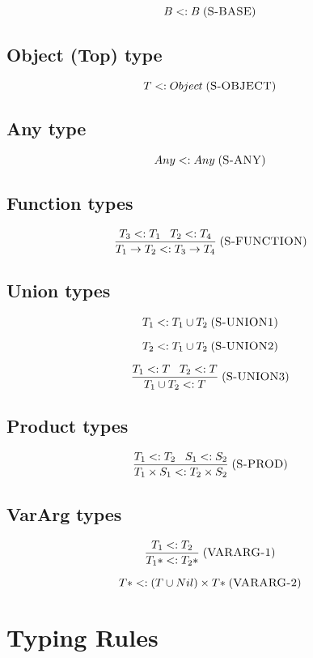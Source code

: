 \documentclass[12pt]{article}
\newcommand{\mylabel}[1]{\; (\textsc{#1})}
\newcommand{\subtype}{<:}
\begin{document}
\[
B \subtype B
\mylabel{S-BASE}
\]

\subsection{Object (Top) type}

\[
T \subtype Object
\mylabel{S-OBJECT}
\]

\subsection{Any type}

\[
Any \subtype Any
\mylabel{S-ANY}
\]

\subsection{Function types}

\[
\frac{T_{3} \subtype T_{1} \;\;\; T_{2} \subtype T_{4}}
     {T_{1} \rightarrow T_{2} \subtype T_{3} \rightarrow T_{4}}
\mylabel{S-FUNCTION}
\]

\subsection{Union types}

\[
T_{1} \subtype T_{1} \cup T_{2}
\mylabel{S-UNION1}
\]

\[
T_{2} \subtype T_{1} \cup T_{2}
\mylabel{S-UNION2}
\]

\[
\frac{T_{1} \subtype T \;\;\; T_{2} \subtype T}
     {T_{1} \cup T_{2} \subtype T}
\mylabel{S-UNION3}
\]

\subsection{Product types}

\[
\frac{T_{1} \subtype T_{2} \;\;\; S_{1} \subtype S_{2}}
     {T_{1} \times S_{1} \subtype T_{2} \times S_{2}}
\mylabel{S-PROD}
\]

\subsection{VarArg types}

\[
\frac{T_{1} \subtype T_{2}}
     {T_{1}* \subtype T_{2}*}
\mylabel{VARARG-1}
\]

\[
{T*} \subtype (T \cup Nil) \times {T*}
\mylabel{VARARG-2}
\]

\section{Typing Rules}
\end{document}

